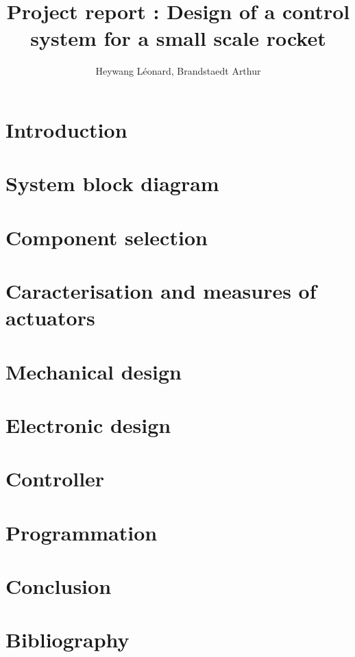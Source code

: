 \documentclass[twoside, openany]{report}
\author{Heywang Léonard, Brandstaedt Arthur}
\title{Project report : Design of a control system for a small scale rocket}
\date{\DTMtoday}
\begin{document}
\fontsize{9}{10.5}\selectfont\blindtext





\tableofcontents
\listoffigures
\listoftables

\newpage
\chapter*{Introduction}

\chapter*{System block diagram}

\newpage


\chapter{Component selection}


\chapter{Caracterisation and measures of actuators}


\chapter{Mechanical design}


\chapter{Electronic design}


\chapter{Controller}


\chapter{Programmation}


\chapter*{Conclusion}



\chapter*{Bibliography}
\printbibliography

\newpage
\appendix
\end{document}
